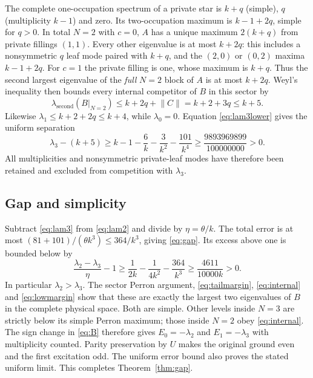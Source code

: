 \documentclass[11pt]{article}
\newcommand{\norm}[1]{\lVert#1\rVert}
\begin{document}
The complete one-occupation spectrum of a private star is $k+q$
(simple), $q$ (multiplicity $k-1$) and zero. Its two-occupation
maximum is $k-1+2q$, simple for $q>0$. In total $N=2$ with $c=0$,
$A$ has a unique maximum $2(k+q)$ from private fillings $(1,1)$.
Every other eigenvalue is at most $k+2q$: this includes a
nonsymmetric $q$ leaf mode paired with $k+q$, and the $(2,0)$ or
$(0,2)$ maxima $k-1+2q$. For $c=1$ the private filling is one,
whose maximum is $k+q$. Thus the second largest eigenvalue of the
\emph{full} $N=2$ block of $A$ is at most $k+2q$. Weyl's inequality
then bounds every internal competitor of $B$ in this sector by
\begin{equation}
 \lambda_{\mathrm{second}}(B|_{N=2})
 \leq k+2q+\norm C=k+2+3q\leq k+5.
 \label{eq:internal}
\end{equation}
Likewise $\lambda_1\leq k+2+2q\leq k+4$, while $\lambda_0=0$.
Equation \eqref{eq:lam3lower} gives the uniform separation
\begin{equation}
 \lambda_3-(k+5)
 \geq k-1-\frac6k-\frac3{k^2}-\frac{101}{k^4}
 \geq\frac{9893969899}{100000000}>0.
 \label{eq:lowmargin}
\end{equation}
All multiplicities and nonsymmetric private-leaf modes have therefore
been retained and excluded from competition with $\lambda_3$.

\subsection{Gap and simplicity}

Subtract \eqref{eq:lam3} from \eqref{eq:lam2} and divide by
$\eta=\theta/k$. The total error is at most
$(81+101)/(\theta k^3)\leq364/k^3$, giving \eqref{eq:gap}.
Its excess above one is bounded below by
\begin{equation}
 \frac{\lambda_2-\lambda_3}{\eta}-1
 \geq\frac1{2k}-\frac1{4k^2}-\frac{364}{k^3}
 \geq\frac{4611}{10000k}>0.
 \label{eq:strict}
\end{equation}
In particular $\lambda_2>\lambda_3$. The sector Perron argument,
\eqref{eq:tailmargin}, \eqref{eq:internal} and \eqref{eq:lowmargin}
show that these are exactly the largest two eigenvalues of $B$ in
the complete physical space. Both are simple. Other levels inside
$N=3$ are strictly below its simple Perron maximum; those inside
$N=2$ obey \eqref{eq:internal}. The sign change in \eqref{eq:B}
therefore gives $E_0=-\lambda_2$ and $E_1=-\lambda_3$ with
multiplicity counted. Parity preservation by $U$ makes the original
ground even and the first excitation odd. The uniform error bound
also proves the stated uniform limit. This completes
Theorem~\ref{thm:gap}.
\end{document}
